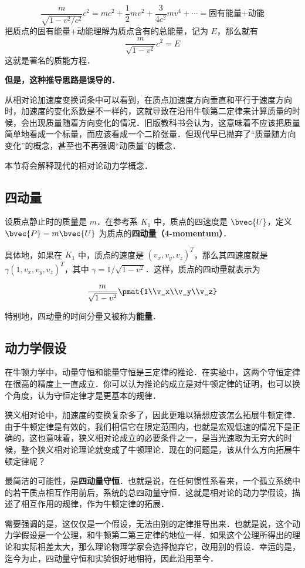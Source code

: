 \begin{equation}
\frac{m}{\sqrt{1-v^2/c^2}}c^2=mc^2+\frac{1}{2}mv^2+\frac{3}{4c^2}mv^4+\cdots=\text{固有能量+动能}
\end{equation}
把质点的固有能量+动能理解为质点含有的总能量，记为 $E$，那么就有
\begin{equation}
\frac{m}{\sqrt{1-v^2}}c^2=E
\end{equation}
这就是著名的质能方程．

\textbf{但是，这种推导思路是误导的．}


从相对论加速度变换词条中可以看到，在质点加速度方向垂直和平行于速度方向时，加速度的变化系数是不一样的，这就导致在沿用牛顿第二定律来计算质量的时候，会出现质量随着方向变化的情况．旧版教科书会认为，这意味着不应该把质量简单地看成一个标量，而应该看成一个二阶张量．但现代早已抛弃了“质量随方向变化”的概念，甚至也不再强调“动质量”的概念．

本节将会解释现代的相对论动力学概念．

\subsection{四动量}

设质点静止时的质量是 $m$．在参考系 $K_1$ 中，质点的四速度是 $\bvec{U}$，定义 $\bvec{P}=m\bvec{U}$ 为质点的\textbf{四动量（4-momentum）}．

具体地，如果在 $K_1$ 中，质点的速度是 $(v_x, v_y, v_z)^T$，那么其四速度就是 $\gamma(1, v_x, v_y, v_z)^T$，其中 $\gamma=1/\sqrt{1-v^2}$．这样，质点的四动量就表示为

\begin{equation}
\frac{m}{\sqrt{1-v^2}}\pmat{1\\v_x\\v_y\\v_z}
\end{equation}

特别地，四动量的时间分量又被称为\textbf{能量}．


\subsection{动力学假设}

在牛顿力学中，动量守恒和能量守恒是三定律的推论．在实验中，这两个守恒定律在很高的精度上一直成立．你可以认为推论的成立是对牛顿定律的证明，也可以换个角度，认为守恒定律才是更基本的规律．

狭义相对论中，加速度的变换复杂多了，因此更难以猜想应该怎么拓展牛顿定律．由于牛顿定律是有效的，我们相信它在限定范围内，也就是宏观低速的情况下是正确的，这也意味着，狭义相对论成立的必要条件之一，是当光速取为无穷大的时候，整个狭义相对论理论就变成了牛顿理论．现在的问题是，该从什么方向拓展牛顿定律呢？

最简洁的可能性，是\textbf{四动量守恒}．也就是说，在任何惯性系看来，一个孤立系统中的若干质点相互作用前后，系统的总四动量守恒．这就是相对论的动力学假设，描述了相互作用的规律，作为牛顿定律的拓展．

需要强调的是，这仅仅是一个假设，无法由别的定律推导出来．也就是说，这个动力学假设是一个公理，和牛顿第二第三定律的地位一样．如果这个公理所得出的理论和实际相差太大，那么理论物理学家会选择抛弃它，改用别的假设．幸运的是，迄今为止，四动量守恒和实验很好地相符，因此沿用至今．




